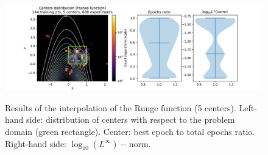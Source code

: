 \documentclass[12pt]{report} %
\begin{document}
\begin{figure}[H]
  {\includegraphics[width=\textwidth, trim={2cm 0 2.8cm 0}, clip=true]{imagenes/experiments/2d/franke_interpolation/tr12_c5_franke.pdf}}
  \caption{Results of the interpolation of the Runge function (5 centers). 
  Left-hand side: distribution of centers with respect to the problem domain (green rectangle). Center: best epoch to total epochs ratio.
  Right-hand side: $\log_{10}(L^\infty)-$norm.}
  \label{fig:franke-tr12-c5}
\end{figure}
\end{document}
